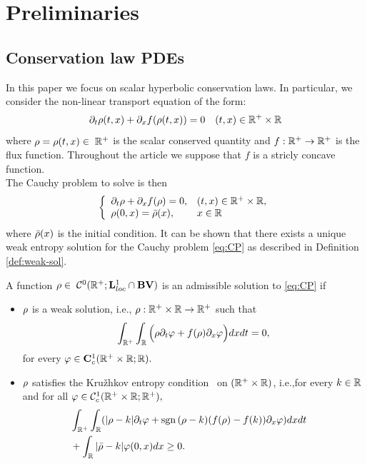 \section{Preliminaries\label{sec:Preliminaries}}


\subsection{Conservation law PDEs\label{sub:Hyperbolic-PDE's}}

In this paper we focus on scalar hyperbolic conservation laws. In particular, we consider the non-linear transport equation of the form:
\begin{equation}
	\partial_t\cvar\left(t,x\right)+\partial_x f\left(\cvar\left(t,x\right)\right)=0 \quad (t,x) \in \R^+ \times \R\label{eq:cons}
\end{equation}
where $\rho=\rho(t,x) \in \; \mathbb{R}^+$ is the scalar conserved quantity and $f:\mathbb{R}^+\rightarrow \mathbb{R}^+$ is the flux function. Throughout the article we suppose that $f$ is a stricly concave function. \\
The Cauchy problem to solve is then 
\begin{equation}
	\label{eq:CP}
	\left\{
	\begin{array}{ll}
		\partial_t \cvar+ \partial_x f(\cvar) =0, & (t,x)\in\R^+\times \R, \\
		\cvar(0,x)=\initstate(x),                 & x \in \R               \\
	\end{array}
	\right.
\end{equation}
where $\bar{\rho}(x)$ is the initial condition.
It can be shown that there exists a unique weak entropy solution for the Cauchy problem \eqref{eq:CP} as described in Definition \ref{def:weak-sol}. 
\begin{defn}\label{def:weak-sol}
	A function $\rho \in \; \mathcal{C}^0(\mathbb{R}^+; \mathbf{L}^1_{loc}\cap \mathbf{BV})$ is an admissible solution to \eqref{eq:CP} if
	\begin{itemize}
		\item $\rho$ is a weak solution, i.e., $\rho : \mathbb{R}^+\times\mathbb{R}\rightarrow \mathbb{R}^+$ such that
		\begin{equation}	
			\int_{\mathbb{R}^+}\int_{\mathbb{R}}\Big( \rho \partial_t\varphi +f(\rho)\partial_x\varphi \Big)dxdt=0, 
		\end{equation}
		for every $\varphi \in \mathbf{C}^1_c(\mathbb{R}^+\times \mathbb{R}; \mathbb{R}).$
		\item $\rho$ satisfies the Kru\v{z}hkov entropy condition~\cite{Kruzkov1970} on $(\mathbb{R}^+\times\mathbb{R})$, i.e.,for every $k\in \mathbb{R}$ and for all $\varphi \in \mathcal{C}^1_c(\mathbb{R}^+\times \mathbb{R};\mathbb{R}^+),$
		\begin{eqnarray}
			\label{eq:kruzhkov}
			&\int_{\R^+}\int_{\R}(\modulo{\cvar -k}  \partial_t \varphi + \sgn{(\cvar-k }) (f(\cvar)-f(k))\partial_x\varphi)dxdt& \nonumber\\
			&+\int_{\R}\modulo{\initstate-k}\varphi(0,x)dx\geq 0.&
		\end{eqnarray} 
	\end{itemize}
\end{defn}
